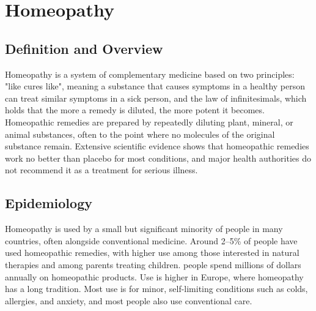 \chapter{Homeopathy}

\section*{Definition and Overview}
Homeopathy is a system of complementary medicine based on two principles: "like cures like", meaning a substance that causes symptoms in a healthy person can treat similar symptoms in a sick person, and the law of infinitesimals, which holds that the more a remedy is diluted, the more potent it becomes. Homeopathic remedies are prepared by repeatedly diluting plant, mineral, or animal substances, often to the point where no molecules of the original substance remain. Extensive scientific evidence shows that homeopathic remedies work no better than placebo for most conditions, and major health authorities do not recommend it as a treatment for serious illness.

\section*{Epidemiology}
Homeopathy is used by a small but significant minority of people in many countries, often alongside conventional medicine. Around 2--5\% of people have used homeopathic remedies, with higher use among those interested in natural therapies and among parents treating children. people spend millions of dollars annually on homeopathic products. Use is higher in Europe, where homeopathy has a long tradition. Most use is for minor, self-limiting conditions such as colds, allergies, and anxiety, and most people also use conventional care.

